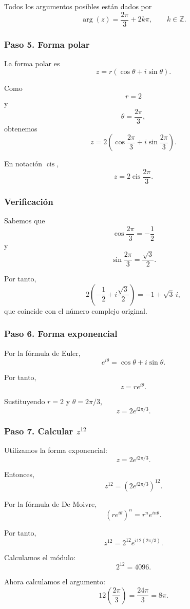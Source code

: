 \documentclass[12pt]{article}
\begin{document}
Todos los argumentos posibles están dados por
\[
\boxed{
\arg(z)
=
\frac{2\pi}{3}+2k\pi,
\qquad
k\in\mathbb Z
}.
\]

\subsubsection*{Paso 5. Forma polar}

La forma polar es
\[
z=r(\cos\theta+i\sin\theta).
\]

Como
\[
r=2
\]
y
\[
\theta=\frac{2\pi}{3},
\]
obtenemos
\[
\boxed{
z=
2\left(
\cos\frac{2\pi}{3}
+
i\sin\frac{2\pi}{3}
\right)
}.
\]

En notación $\operatorname{cis}$,
\[
\boxed{
z=
2\operatorname{cis}\frac{2\pi}{3}
}.
\]

\subsubsection*{Verificación}

Sabemos que
\[
\cos\frac{2\pi}{3}
=
-\frac12
\]
y
\[
\sin\frac{2\pi}{3}
=
\frac{\sqrt3}{2}.
\]

Por tanto,
\[
2\left(
-\frac12
+
i\frac{\sqrt3}{2}
\right)
=
-1+\sqrt3\,i,
\]
que coincide con el número complejo original.

\subsubsection*{Paso 6. Forma exponencial}

Por la fórmula de Euler,
\[
e^{i\theta}
=
\cos\theta+i\sin\theta.
\]

Por tanto,
\[
z=re^{i\theta}.
\]

Sustituyendo $r=2$ y $\theta=2\pi/3$,
\[
\boxed{
z=2e^{i2\pi/3}
}.
\]

\subsubsection*{Paso 7. Calcular $z^{12}$}

Utilizamos la forma exponencial:
\[
z=2e^{i2\pi/3}.
\]

Entonces,
\[
z^{12}
=
\left(
2e^{i2\pi/3}
\right)^{12}.
\]

Por la fórmula de De Moivre,
\[
\left(re^{i\theta}\right)^n
=
r^ne^{in\theta}.
\]

Por tanto,
\[
z^{12}
=
2^{12}
e^{i12(2\pi/3)}.
\]

Calculamos el módulo:
\[
2^{12}=4096.
\]

Ahora calculamos el argumento:
\[
12\left(\frac{2\pi}{3}\right)
=
\frac{24\pi}{3}
=
8\pi.
\]
\end{document}
